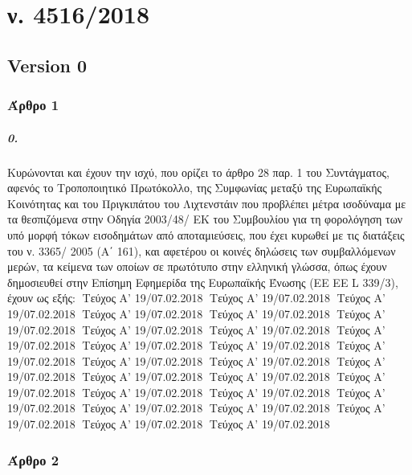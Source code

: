 \documentclass[a4paper,oneside, 10pt]{book}
\begin{document}
\chapter*{ ν. 4516/2018 }\section* { Version  0 } 
\subsection*{ Άρθρο 1 }
\paragraph { 0. }  Κυρώνονται και έχουν την ισχύ, που ορίζει το άρθρο 28 παρ. 1 του Συντάγματος, αφενός το Τροποποιητικό Πρωτόκολλο, της Συμφωνίας μεταξύ της Ευρωπαϊκής Κοινότητας και του Πριγκιπάτου του Λιχτενστάιν που προβλέπει μέτρα ισοδύναμα με τα θεσπιζόμενα στην Οδηγία 2003/48/ ΕΚ του Συμβουλίου για τη φορολόγηση των υπό μορφή τόκων εισοδημάτων από αποταμιεύσεις, που έχει κυρωθεί με τις διατάξεις του ν. 3365/ 2005 (Α΄ 161), και αφετέρου οι κοινές δηλώσεις των συμβαλλόμενων μερών, τα κείμενα των οποίων σε πρωτότυπο στην ελληνική γλώσσα, όπως έχουν δημοσιευθεί στην Επίσημη Εφημερίδα της Ευρωπαϊκής Ένωσης (ΕΕ ΕΕ L 339/3), έχουν ως εξής:     Τεύχος Α’ 19/07.02.2018       Τεύχος Α’ 19/07.02.2018       Τεύχος Α’ 19/07.02.2018       Τεύχος Α’ 19/07.02.2018       Τεύχος Α’ 19/07.02.2018       Τεύχος Α’ 19/07.02.2018       Τεύχος Α’ 19/07.02.2018       Τεύχος Α’ 19/07.02.2018       Τεύχος Α’ 19/07.02.2018       Τεύχος Α’ 19/07.02.2018       Τεύχος Α’ 19/07.02.2018       Τεύχος Α’ 19/07.02.2018       Τεύχος Α’ 19/07.02.2018       Τεύχος Α’ 19/07.02.2018       Τεύχος Α’ 19/07.02.2018       Τεύχος Α’ 19/07.02.2018       Τεύχος Α’ 19/07.02.2018       Τεύχος Α’ 19/07.02.2018       Τεύχος Α’ 19/07.02.2018       Τεύχος Α’ 19/07.02.2018       Τεύχος Α’ 19/07.02.2018       Τεύχος Α’ 19/07.02.2018       Τεύχος Α’ 19/07.02.2018       Τεύχος Α’ 19/07.02.2018       Τεύχος Α’ 19/07.02.2018       Τεύχος Α’ 19/07.02.2018   
\subsection*{ Άρθρο 2 }
\end{document}
